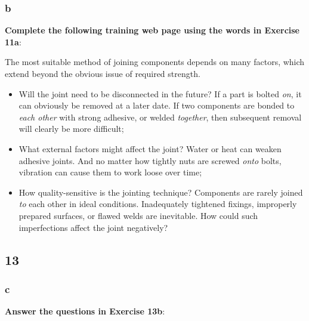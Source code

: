 \subsubsection{b}

\textbf{Complete the following training web page using the words in Exercise 11a}:

The most suitable method of joining components depends on many factors, which extend beyond the obvious issue of required strength.

\begin{itemize}

\item Will the joint need to be disconnected in the future? If a part is bolted \textit{on}, it can obviously be removed at a later date. If two components are bonded to \textit{each other} with strong adhesive, or welded \textit{together}, then subsequent removal will clearly be more difficult;

\item What external factors might affect the joint? Water or heat can weaken adhesive joints. And no matter how tightly nuts are screwed \textit{onto} bolts, vibration can cause them to work loose over time;

\item How quality-sensitive is the jointing technique? Components are rarely joined \textit{to} each other in ideal conditions. Inadequately tightened fixings, improperly prepared surfaces, or flawed welds are inevitable. How could such imperfections affect the joint negatively? 

\end{itemize}

\subsection{13}

\subsubsection{c}

\textbf{Answer the questions in Exercise 13b}:

